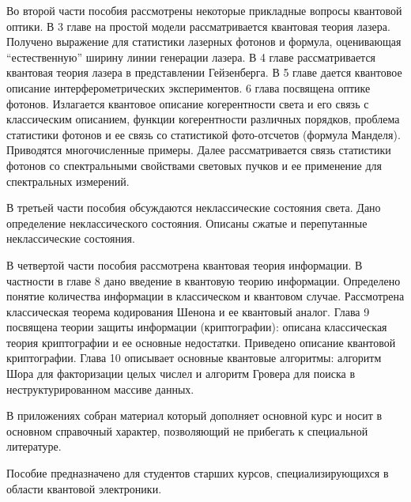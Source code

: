 Во второй части пособия рассмотрены некоторые прикладные вопросы
квантовой оптики. В 3 главе на простой модели рассматривается квантовая теория
лазера. Получено выражение для статистики лазерных фотонов и формула,
оценивающая ``естественную'' ширину линии генерации лазера. 
В 4 главе рассматривается квантовая теория лазера в представлении
Гейзенберга. В 5 главе дается квантовое описание
интерферометрических экспериментов.
6 глава посвящена оптике фотонов. Излагается квантовое описание
когерентности света и его связь с классическим описанием, функции
когерентности различных порядков, проблема статистики фотонов и ее
связь со статистикой фото-отсчетов (формула Манделя). Приводятся
многочисленные примеры. Далее рассматривается связь статистики фотонов
со спектральными свойствами световых пучков и ее применение для
спектральных измерений.

В третьей части пособия обсуждаются неклассические
состояния света. Дано определение неклассического состояния. Описаны
сжатые и перепутанные неклассические состояния. 

В четвертой части пособия рассмотрена квантовая теория информации. В
частности в главе 8 дано введение в квантовую теорию
информации. Определено понятие количества 
информации в классическом и квантовом случае. Рассмотрена классическая
теорема кодирования Шенона и ее квантовый аналог. Глава 9 посвящена
теории защиты информации (криптографии): описана классическая
теория криптографии и ее основные недостатки. Приведено описание
квантовой криптографии. Глава 10 описывает основные квантовые
алгоритмы: алгоритм Шора для факторизации целых числел и алгоритм
Гровера для поиска в неструктурированном массиве данных.

В приложениях собран материал который дополняет основной курс и носит
в основном справочный характер, позволяющий не прибегать к специальной
литературе. 

Пособие предназначено для студентов старших курсов, специализирующихся
в области квантовой электроники.  
